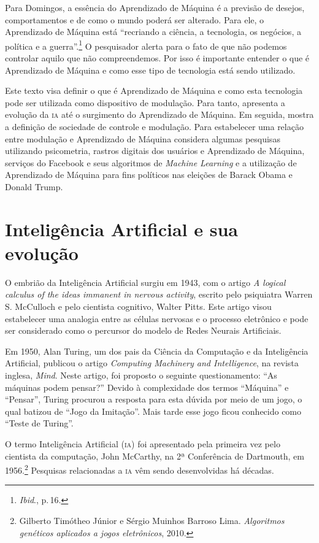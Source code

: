 Para Domingos, a essência do Aprendizado de Máquina é a previsão
de desejos, comportamentos e de como o mundo poderá ser alterado. Para
ele, o Aprendizado de Máquina está ``recriando a ciência, a tecnologia,
os negócios, a política e a guerra''.\footnote{\textit{Ibid}., p.\,16.} O pesquisador alerta para
o fato de que não podemos controlar aquilo que não compreendemos. Por
isso é importante entender o que é Aprendizado de Máquina e como esse
tipo de tecnologia está sendo utilizado.

Este texto visa definir o que é Aprendizado de Máquina e como esta
tecnologia pode ser utilizada como dispositivo de modulação. Para tanto,
apresenta a evolução da \textsc{ia} até o surgimento do Aprendizado de Máquina.
Em seguida, mostra a definição de sociedade de controle e modulação.
Para estabelecer uma relação entre modulação e Aprendizado de Máquina
considera algumas pesquisas utilizando psicometria, rastros digitais dos
usuários e Aprendizado de Máquina, serviços do Facebook e seus
algoritmos de \emph{Machine Learning} e a utilização de Aprendizado de
Máquina para fins políticos nas eleições de Barack Obama e Donald Trump.

\section{Inteligência Artificial e sua evolução}

O embrião da Inteligência Artificial surgiu em 1943, com o artigo
\emph{A logical calculus of the ideas immanent in nervous activity},
escrito pelo psiquiatra Warren S. McCulloch e
pelo cientista cognitivo, Walter Pitts. Este artigo visou estabelecer
uma analogia entre as células nervosas e o processo eletrônico e pode ser considerado como o percursor do modelo de Redes Neurais Artificiais.

Em 1950, Alan Turing, um dos pais da Ciência da Computação e da
Inteligência Artificial, publicou o artigo \emph{Computing Machinery
and Intelligence}, na revista inglesa, \emph{Mind}.
Neste artigo, foi proposto o seguinte questionamento: ``As máquinas
podem pensar?'' Devido à complexidade dos termos ``Máquina'' e
``Pensar'', Turing procurou a resposta para esta dúvida por meio de um
jogo, o qual batizou de ``Jogo da Imitação''. Mais tarde
esse jogo ficou conhecido como ``Teste de Turing''.

O termo Inteligência Artificial (\textsc{ia}) foi apresentado pela primeira vez
pelo cientista da computação, John McCarthy, na 2ª Conferência de
Dartmouth, em 1956.\footnote{Gilberto Timótheo Júnior e Sérgio Muinhos Barroso Lima. \emph{Algoritmos genéticos aplicados a jogos eletrônicos}, 2010.} Pesquisas relacionadas a \textsc{ia} vêm sendo desenvolvidas há décadas.

